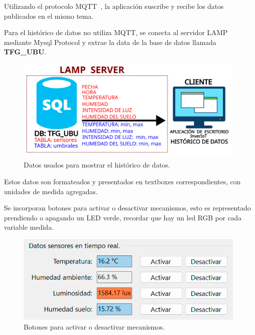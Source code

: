 Utilizando el protocolo MQTT~\cite{manual:MQTT}, la aplicación suscribe y recibe los datos publicados en el mismo tema. 

Para el histórico de datos no utiliza MQTT, se conecta al servidor LAMP mediante Mysql Protocol y extrae la data de la base de datos llamada \textbf{TFG\_UBU}.

\begin{figure}[h]
    \centering
    \includegraphics[width=1\textwidth]{img/diagramas/mqtt_InverIoT_Historico.png}
    \caption{Datos usados para mostrar el histórico de datos.}
\end{figure}


Estos datos son formateados y presentados en textboxes correspondientes, con unidades de medida agregadas.

Se incorporan botones para activar o desactivar mecanismos, esto es representado prendiendo o apagando un LED verde, recordar que hay un led RGB por cada variable medida.


\begin{figure}[h]
    \centering
    \includegraphics[width=1\textwidth]{img/desarrollo/InverIoT_Desktop_botones_control.png}
	\caption{Botones para activar o desactivar mecanismos.}
\end{figure}

